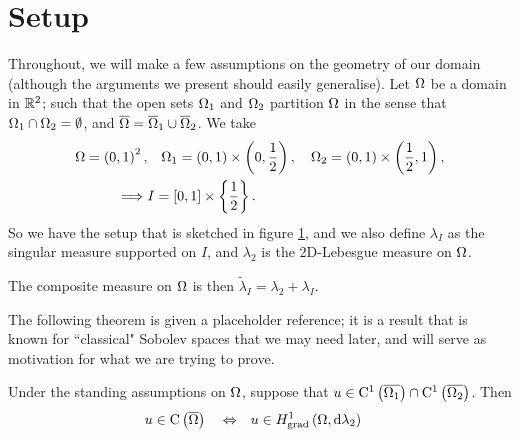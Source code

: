 \documentclass[11pt]{report}
\theoremstyle{plain}
\newcommand{\tlambda}{\tilde{\lambda}}
\newcommand{\C}[1]{\mathrm{C}^1\bracs{#1}}
\begin{document}
\section*{Setup}
Throughout, we will make a few assumptions on the geometry of our domain (although the arguments we present should easily generalise).
Let $\Omega$ be a domain in $\mathbb{R}^2$; such that the open sets $\Omega_1$ and $\Omega_2$ partition $\Omega$ in the sense that $\Omega_1\cap\Omega_2=\emptyset$, and $\overline{\Omega} = \overline{\Omega}_1\cup\overline{\Omega}_2$.
We take
\begin{align*}
	\Omega = \left( 0,1 \right)^2, &\quad \Omega_1 = \left( 0,1 \right)\times\left( 0,\frac{1}{2} \right),
	\quad \Omega_2 = \left( 0,1 \right)\times\left( \frac{1}{2},1 \right), \\
	\implies &I = \left[ 0,1 \right]\times\left\{ \frac{1}{2} \right\}.	
\end{align*}
So we have the setup that is sketched in figure \ref{fig:MeetingSituation}, and we also define $\lambda_I$ as the singular measure supported on $I$, and $\lambda_2$ is the 2D-Lebesgue measure on $\Omega$.
\begin{figure}[h!]
	\centering
	\caption{\label{fig:MeetingSituation}}
\end{figure}
The composite measure on $\Omega$ is then $\tlambda_I = \lambda_2 + \lambda_I$. \newline

The following theorem is given a placeholder reference; it is a result that is known for ``classical" Sobolev spaces that we may need later, and will serve as motivation for what we are trying to prove.
\begin{theorem} \label{thm:MeetingThm}
	Under the standing assumptions on $\Omega$, suppose that $u\in \C{\overline{\ddom_1}}\cap \C{\overline{\ddom_2}}$.
	Then
	\begin{align*}
		u\in\mathrm{C}\left( \overline{\Omega} \right) \quad\Leftrightarrow\quad & u\in H^1_\mathrm{grad}\left( \Omega, \mathrm{d}\lambda_2 \right)
	\end{align*}
\end{theorem}
\end{document}
